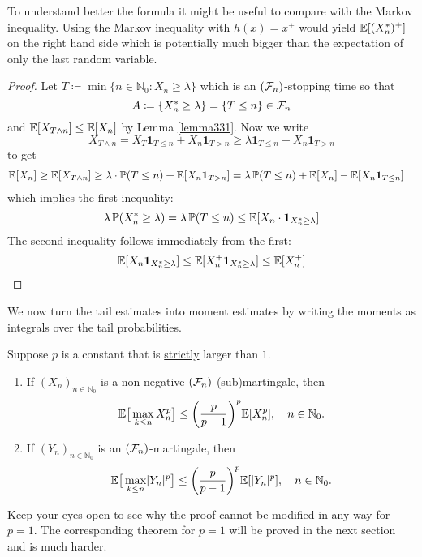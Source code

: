 To understand better the formula it might be useful to compare with the Markov inequality. Using the Markov inequality with $h(x)=x^+$ would yield $\mathbb{E}[(X^*_n)^+]$ on the right hand side which is potentially much bigger than the expectation of only the last random variable.

\begin{proof}[Proof]
	Let $T \coloneqq \min\{ n\in\mathbb{N}_0 \colon X_n \geq \lambda \}$ which is an $(\mathcal{F}_n)$-stopping time so that $$A \coloneqq \{ X_n^*\geq \lambda \} = \{T \leq n \} \in \mathcal{F}_n$$ and  $ \mathbb{E}[X_{T\wedge n}] \leq \mathbb{E}[X_n]$ by  Lemma \ref{lemma331}.
	  Now we write $$ X_{T \wedge n} = X_T \mathbf 1_{T \leq n}+ X_n \mathbf 1_{T>n}\geq \lambda \mathbf 1_{T \leq n} + X_n \mathbf 1_{T > n}$$ to get
	\begin{align*}
		\mathbb{E}[X_n] \geq \mathbb{E}[X_{T\wedge n}] &\geq \lambda \cdot \mathbb{P}(T\leq n) + \mathbb{E}[X_n \mathbf 1_{T>n}] 
		=\lambda \,\mathbb{P}(T\leq n) + \mathbb{E}[X_n] - \mathbb{E}[X_n \mathbf 1_{T\leq n}]
	\end{align*}
	which implies the first inequality: $$\lambda\, \mathbb{P}(X_n^* \geq \lambda) = \lambda \,\mathbb{P}(T \leq n ) \leq \mathbb{E}[X_n \cdot \mathbf 1_{X_n^*\geq \lambda}]$$
	The second inequality follows immediately from the first: $$ \mathbb{E}[X_n \mathbf 1_{X_n^*\geq \lambda}] \leq \mathbb{E}[X_n^+\mathbf 1_{X_n^*\geq \lambda}] \leq \mathbb{E}[X_n^+]$$
\end{proof}
We now turn the tail estimates into moment estimates by writing the moments as integrals over the tail probabilities.
\begin{lsatz}
\begin{theorem}\label{max_inequality}
	Suppose $p$ is a constant that is \underline{strictly} larger than $1$.
	\begin{enumerate}[label=(\roman*)]
		\item
			If $(X_n)_{n\in\mathbb{N}_0}$ is a non-negative $(\mathcal{F}_n)$-(sub)martingale, then $$ \mathbb{E}\big[ \max\limits_{k \leq n} X_n^p\big] \leq \bigg(\frac{p}{p-1}\bigg)^p \mathbb{E}[X_n^p], \quad n\in \mathbb{N}_0.$$
		\item
			If $(Y_n)_{n\in{\mathbb N}_0}$ is an $(\mathcal{F}_n)$-martingale, then $$ \mathbb{E}\big[ \max\limits_{k \leq n} \lvert Y_n\rvert^p \big] \leq \bigg(\frac{p}{p-1}\bigg)^p \mathbb{E}[\lvert Y_n\rvert^p],\quad n\in \mathbb{N}_0.$$
	\end{enumerate}
\end{theorem}
\end{lsatz}
Keep your eyes open to see why the proof cannot be modified in any way for $p=1$. The corresponding theorem for $p=1$ will be proved in the next section and is much harder.
